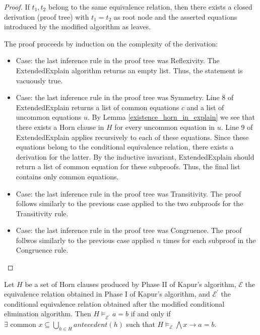 \begin{proof} 
  If $t_1, t_2$ belong to the same equivalence relation,
  then there exists a closed derivation (proof tree) 
  with $t_1 = t_2$ as root node and the asserted
  equations introduced by the modified algorithm
  as leaves.

  The proof proceeds by induction on the complexity of the 
  derivation:

  \begin{itemize}
    \item Case: the last inference rule in the proof 
      tree was Reflexivity. The ExtendedExplain 
      algorithm returns an empty list. Thus, the
      statement is vacuously true.
    \item Case: the last inference rule in the proof 
      tree was Symmetry. Line 8 of ExtendedExplain
      returns a list of common equations $c$ and a list
      of uncommon equations $u$. 
      By Lemma \ref{existence_horn_in_explain}
      we see that there exists a Horn clause in $H$ for
      every uncommon equation in $u$. Line 9 of 
      ExtendedExplain applies recursively to each of 
      these equations. Since these equations belong
      to the conditional equivalence relation, there
      exists a derivation for the latter.
      By the inductive invariant, ExtendedExplain
      should return a list of common equation for 
      these subproofs. Thus, the final list contains
      only common equations.
    \item Case: the last inference rule in the proof 
      tree was Transitivity. The proof follows similarly
      to the previous case applied to the two subproofs
      for the Transitivity rule.
    \item Case: the last inference rule in the proof 
      tree was Congruence. The proof follwos similarly
      to the previous case applied $n$ times for each
      subproof in the Congruence rule.
  \end{itemize}
\end{proof}

\begin{corollary}
  Let $H$ be a set of Horn clauses produced by 
  Phase II of Kapur's algorithm, $\mathcal{E}$ the 
  equivalence relation obtained in Phase I of Kapur's 
  algorithm, and $\mathcal{E^{'}}$ the conditional 
  equivalence relation obtained after the modified
  conditional elimination algorithm. Then
  $H \models_{\mathcal{E^{'}}} a = b$ if and only if
  $\exists \text{ common } x \subseteq 
  \bigcup_{h \in H} antecedent(h)$ such that
  $H \models_{\mathcal{E}} \bigwedge x \rightarrow a = b$.
\end{corollary}

